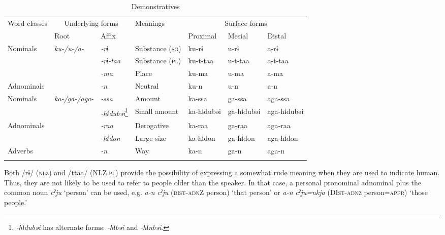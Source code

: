 \begin{sidewaystable}
\caption{\label{tab:key:37}Demonstratives}
\begin{tabular}{lllllll}
\lsptoprule
Word classes  &  \multicolumn{2}{c}{Underlying forms} & Meanings  &  \multicolumn{3}{c}{Surface forms}\\\cmidrule(lr){2-3}\cmidrule(lr){5-7}
              & Root & Affix & & Proximal & Mesial & Distal\\\midrule
Nominals      & \textit{ku-/u-/a-} & \textit{-rɨ}     & Substance (\textsc{sg}) &   ku-rɨ    & u-rɨ    & a-rɨ   \\
              &                    & \textit{-rɨ-taa} & Substance (\textsc{pl}) &   ku-t-taa & u-t-taa & a-t-taa\\
              &                    & \textit{-ma}     & Place          &   ku-ma    & u-ma    & a-ma   \\
Adnominals    &                    & \textit{-n}      & Neutral        &   ku-n     & u-n     & a-n    \\
Nominals      & \textit{ka-/ga-/aga-} & \textit{-ssa} & Amount         &   ka-ssa   & ga-ssa  & aga-ssa\\
              &                       & \textit{-hɨdubəi}\footnote{\textit{{}-hɨdubəi} has alternate forms: \textit{{}-hɨbəi} and \textit{{}-hɨnbəi}.} & Small amount    & ka-hɨdubəi  & ga-hɨdubəi & aga-hɨdubəi\\
Adnominals    &                       & \textit{-raa}     & Derogative   & ka-raa   & ga-raa    & aga-raa  \\
              &                       & \textit{-hɨdon}   & Large size   & ka-hɨdon & ga-hɨdon  & aga-hɨdon\\
Adverbs       &                       & \textit{-n}       & Way          & ka-n     & ga-n      & aga-n    \\
\lspbottomrule
\end{tabular}
\end{sidewaystable}

Both /rɨ/ (\textsc{nlz}) and /ttaa/ (NLZ.\textsc{pl}) provide the possibility of expressing a somewhat rude meaning when they are used to indicate human. Thus, they are not likely to be used to refer to people older than the speaker. In that case, a personal pronominal adnominal plus the common noun \textit{cˀju} ‘person’ can be used, e.g. \textit{a-n} \textit{cˀju} (\textsc{dist}-\textsc{adn}Z person) ‘that person’ or \textit{a-n} \textit{cˀju=nkja} (DI\textsc{st}-\textsc{adnz} person=\textsc{appr}) ‘those people.’

